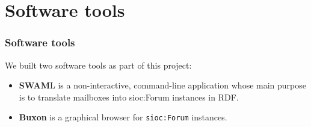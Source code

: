 \documentclass[spanish,notes=hide,16pt]{beamer}
\begin{document}
\section{Software tools}
\frame
{
  \frametitle{Software tools}

  We built two software tools as part of this project:
  \vspace{0.5cm}
  \begin{itemize}
    \item<2->	\begin{Large}\textbf{SWAM}L is a non-interactive, 
		command-line application whose main purpose is to 
		translate mailboxes into sioc:Forum instances in 
		RDF.\end{Large}
    \vspace{0.5cm}
    \item<3->	\begin{Large}\textbf{Buxon} is a graphical browser 
		for \texttt{sioc:Forum} instances.\end{Large}
  \end{itemize}
}
\frame
\end{document}
